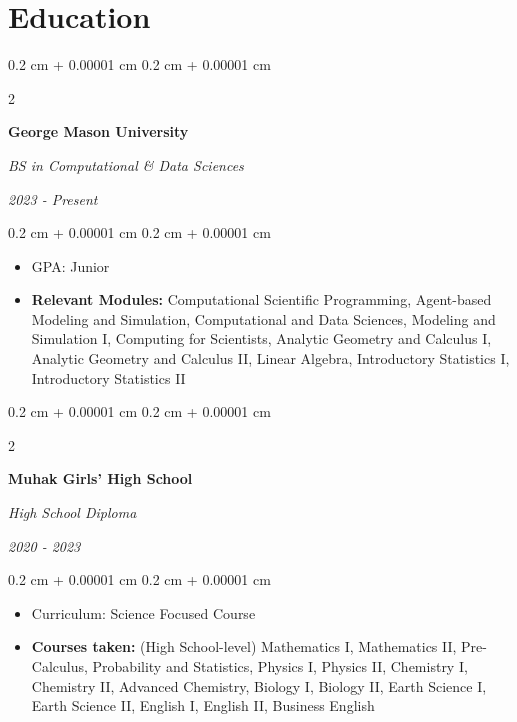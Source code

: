 \documentclass[10pt, letterpaper]{article}
\newenvironment{highlights}{
    \begin{itemize}[
        topsep=0.10 cm,
        parsep=0.10 cm,
        partopsep=0pt,
        itemsep=0pt,
        leftmargin=0.4 cm + 10pt
    ]
}{
    \end{itemize}
} %
\newenvironment{onecolentry}{
    \begin{adjustwidth}{
        0.2 cm + 0.00001 cm
    }{
        0.2 cm + 0.00001 cm
    }
}{
    \end{adjustwidth}
} %
\newenvironment{twocolentry}[2][]{
    \onecolentry
    \def\secondColumn{#2}
    \setcolumnwidth{\fill, 4.5 cm}
    \begin{paracol}{2}
}{
    \switchcolumn \raggedleft \secondColumn
    \end{paracol}
    \endonecolentry
} %
\begin{document}
        \vspace{0.2 cm}

    \section{Education}



        
        \begin{twocolentry}{
            
            
        \textit{2023 - Present}}
            \textbf{George Mason University}

            \textit{BS in Computational \& Data Sciences}
        \end{twocolentry}

        \vspace{0.10 cm}
        
        \begin{onecolentry}
            \begin{highlights}
                \item GPA: Junior
                \item \textbf{Relevant Modules:} Computational Scientific Programming, Agent-based Modeling and Simulation, Computational and Data Sciences, Modeling and Simulation I, Computing for Scientists, Analytic Geometry and Calculus I, Analytic Geometry and Calculus II, Linear Algebra, Introductory Statistics I, Introductory Statistics II 
                
            \end{highlights}
        \end{onecolentry}
     

        \begin{twocolentry}{
            
            
        \textit{2020 - 2023}}
            \textbf{Muhak Girls' High School}

            \textit{High School Diploma}
        \end{twocolentry}

        \vspace{0.10 cm}
        \begin{onecolentry}
            \begin{highlights}
                \item Curriculum: Science Focused Course     
                \item \textbf{Courses taken:} (High School-level) Mathematics I, Mathematics II, Pre-Calculus, Probability and Statistics, Physics I, Physics II, Chemistry I, Chemistry II, Advanced Chemistry, Biology I, Biology II, Earth Science I, Earth Science II, English I, English II, Business English 
                
            \end{highlights}
        \end{onecolentry}
\end{document}
